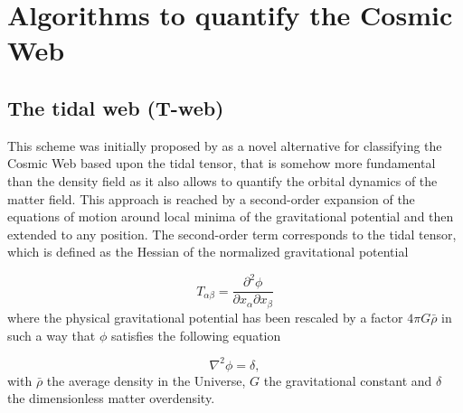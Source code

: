 \documentclass[a4,useAMS,usenatbib,usegraphicx]{latex/mn2e}
\begin{document}
\section{Algorithms to quantify the Cosmic Web}
\label{sec:algorithms_cosmic_web}



\subsection{The tidal web (T-web)}
\label{subsec:Tweb}


This scheme was initially proposed by \citet{Hahn07} as a novel 
alternative for classifying the Cosmic Web based upon the tidal tensor, 
that is somehow more fundamental than the density field as it also allows 
to quantify the orbital dynamics of the matter field. This approach is 
reached by a second-order expansion of the equations of motion around 
local minima of the gravitational potential and then extended to any 
position. The second-order term corresponds to the tidal tensor, which is 
defined as the Hessian of the normalized gravitational potential


\begin{equation}
T_{\alpha\beta} = \frac{\partial^2\phi}{\partial x_{\alpha}\partial x_{\beta}}
\end{equation}
where the physical gravitational potential has been rescaled by a factor 
$4\pi G\bar{\rho}$ in such a way that $\phi$ satisfies the following 
equation

\begin{equation}
\nabla^2\phi = \delta,
\end{equation}
with $\bar{\rho}$ the average density in the Universe, $G$ the 
gravitational constant and $\delta$ the dimensionless matter overdensity.
\end{document}
